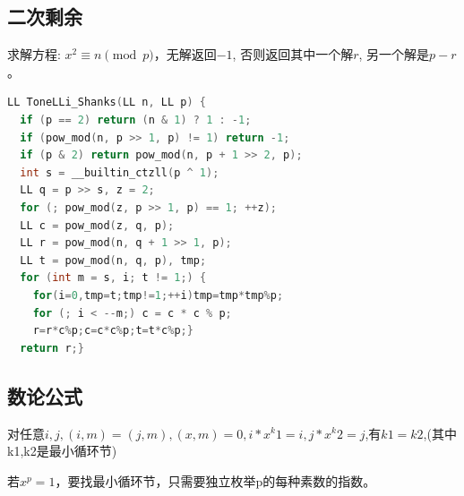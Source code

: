 \documentclass[UTF8,a4paper,titlepage]{ctexart}
\begin{document}
\subsection{二次剩余}
求解方程: $x^2\equiv n\pmod{p}$，无解返回$-1$, 否则返回其中一个解$r$, 另一个解是$p-r$。\par
\begin{lstlisting}[language=C]
LL ToneLLi_Shanks(LL n, LL p) {
  if (p == 2) return (n & 1) ? 1 : -1;
  if (pow_mod(n, p >> 1, p) != 1) return -1;
  if (p & 2) return pow_mod(n, p + 1 >> 2, p);
  int s = __builtin_ctzll(p ^ 1);
  LL q = p >> s, z = 2;
  for (; pow_mod(z, p >> 1, p) == 1; ++z);
  LL c = pow_mod(z, q, p);
  LL r = pow_mod(n, q + 1 >> 1, p);
  LL t = pow_mod(n, q, p), tmp;
  for (int m = s, i; t != 1;) {
    for(i=0,tmp=t;tmp!=1;++i)tmp=tmp*tmp%p;
    for (; i < --m;) c = c * c % p;
    r=r*c%p;c=c*c%p;t=t*c%p;}
  return r;}
\end{lstlisting}

\subsection{数论公式}
对任意$i,j,(i,m)=(j,m),(x,m)=0,i*x^k1=i,j*x^k2=j$,有$k1=k2$,(其中k1,k2是最小循环节)\par
若$x^p=1$，要找最小循环节，只需要独立枚举p的每种素数的指数。\par
\end{document}
